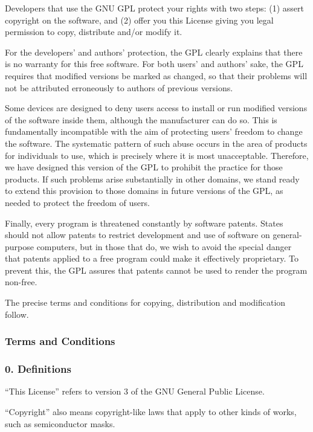 \documentclass[a4paper, 11pt, twoside]{article}
\begin{document}
Developers that use the GNU GPL protect your rights with two steps: (1) assert copyright on the software, and (2) offer you this License giving you legal permission to copy, distribute and/or modify it.

For the developers' and authors' protection, the GPL clearly explains that there is no warranty for this free software. For both users' and authors' sake, the GPL requires that modified versions be marked as changed, so that their problems will not be attributed erroneously to authors of previous versions.

Some devices are designed to deny users access to install or run modified versions of the software inside them, although the manufacturer can do so. This is fundamentally incompatible with the aim of protecting users' freedom to change the software. The systematic pattern of such abuse occurs in the area of products for individuals to use, which is precisely where it is most unacceptable. Therefore, we have designed this version of the GPL to prohibit the practice for those products. If such problems arise substantially in other domains, we stand ready to extend this provision to those domains in future versions of the GPL, as needed to protect the freedom of users.

Finally, every program is threatened constantly by software patents. States should not allow patents to restrict development and use of software on general-purpose computers, but in those that do, we wish to avoid the special danger that patents applied to a free program could make it effectively proprietary. To prevent this, the GPL assures that patents cannot be used to render the program non-free.

The precise terms and conditions for copying, distribution and modification follow.

\subsubsection{Terms and Conditions}

\subsubsection{0. Definitions}

“This License” refers to version 3 of the GNU General Public License.

“Copyright” also means copyright-like laws that apply to other kinds of works, such as semiconductor masks.
\end{document}
